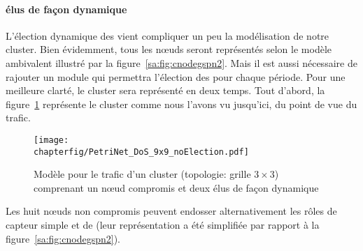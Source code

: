             \paragraph{\cns élus de façon dynamique}
L'élection dynamique des \cns vient compliquer un peu la modélisation de notre cluster.
Bien évidemment, tous les nœuds seront représentés selon le modèle ambivalent illustré par la figure~\ref{sa:fig:cnodegspn2}.
Mais il est aussi nécessaire de rajouter un module qui permettra l'élection des \cns pour chaque période.
Pour une meilleure clarté, le cluster sera représenté en deux temps.
Tout d'abord, la figure~\ref{sa:fig:petridyn} représente le cluster comme nous l'avons vu jusqu'ici, du point de vue du trafic.
\begin{figure}[ht]
    \centering
    \texttt{[image: \\chapterfig/PetriNet\_DoS\_9x9\_noElection.pdf]}
    \caption{Modèle \rpsge pour le trafic d'un cluster (topologie: grille $3\times3$) comprenant un nœud compromis et deux \cns élus de façon dynamique}\label{sa:fig:petridyn}
\end{figure}
Les huit nœuds non compromis peuvent endosser alternativement les rôles de capteur simple et de \cn (leur représentation a été simplifiée par rapport à la figure~\ref{sa:fig:cnodegspn2}).

